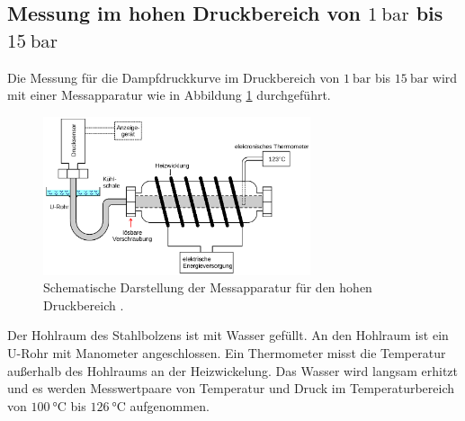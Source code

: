 \subsection{Messung im hohen Druckbereich von $\SI{1}{\bar}$ bis $\SI{15}{\bar}$}
Die Messung für die Dampfdruckkurve im Druckbereich von $\SI{1}{\bar}$ bis
$\SI{15}{\bar}$ wird mit einer Messapparatur wie in Abbildung \ref{fig:messapparatur2}
durchgeführt.
\begin{figure}
  \centering
  \includegraphics[width=0.7\textwidth]{messapparatur2.png}
  \caption{Schematische Darstellung der Messapparatur für den hohen
  Druckbereich \cite{sample}.}
  \label{fig:messapparatur2}
\end{figure}
Der Hohlraum des Stahlbolzens ist mit Wasser gefüllt. An den Hohlraum ist ein
U-Rohr mit Manometer angeschlossen. Ein Thermometer misst die Temperatur außerhalb
des Hohlraums an der Heizwickelung. Das Wasser wird langsam erhitzt und es werden
Messwertpaare von Temperatur und Druck im Temperaturbereich von $\SI{100}{\celsius}$
bis $\SI{126}{\celsius}$ aufgenommen.
